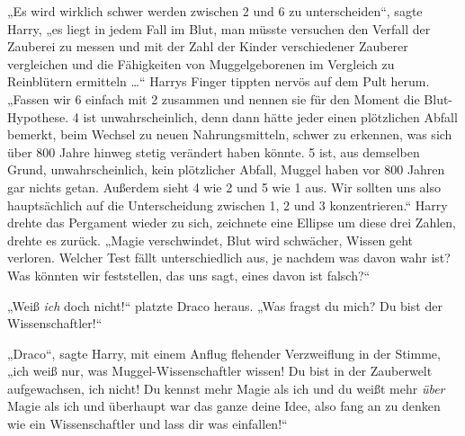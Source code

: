 „Es wird wirklich schwer werden zwischen 2 und 6 zu unterscheiden“, sagte Harry, „es liegt in jedem Fall im Blut, man müsste versuchen den Verfall der Zauberei zu messen und mit der Zahl der Kinder verschiedener Zauberer vergleichen und die Fähigkeiten von Muggelgeborenen im Vergleich zu Reinblütern ermitteln …“ Harrys Finger tippten nervös auf dem Pult herum.
„Fassen wir 6 einfach mit 2 zusammen und nennen sie für den Moment die Blut-Hypothese. 4 ist unwahrscheinlich, denn dann hätte jeder einen plötzlichen Abfall bemerkt, beim Wechsel zu neuen Nahrungsmitteln, schwer zu erkennen, was sich über 800 Jahre hinweg stetig verändert haben könnte. 5 ist, aus demselben Grund, unwahrscheinlich, kein plötzlicher Abfall, Muggel haben vor 800 Jahren gar nichts getan. Außerdem sieht 4 wie 2 und 5 wie 1 aus. Wir sollten uns also hauptsächlich auf die Unterscheidung zwischen 1, 2 und 3 konzentrieren.“ Harry drehte das Pergament wieder zu sich, zeichnete eine Ellipse um diese drei Zahlen, drehte es zurück.
„Magie verschwindet, Blut wird schwächer, Wissen geht verloren. Welcher Test fällt unterschiedlich aus, je nachdem was davon wahr ist? Was könnten wir feststellen, das uns sagt, eines davon ist falsch?“

„Weiß \emph{ich} doch nicht!“ platzte Draco heraus.
„Was fragst du mich? Du bist der Wissenschaftler!“

„Draco“, sagte Harry, mit einem Anflug flehender Verzweiflung in der Stimme, „ich weiß nur, was Muggel-Wissenschaftler wissen! Du bist in der Zauberwelt aufgewachsen, ich nicht! Du kennst mehr Magie als ich und du weißt mehr \emph{über} Magie als ich und überhaupt war das ganze deine Idee, also fang an zu denken wie ein Wissenschaftler und lass dir was einfallen!“

